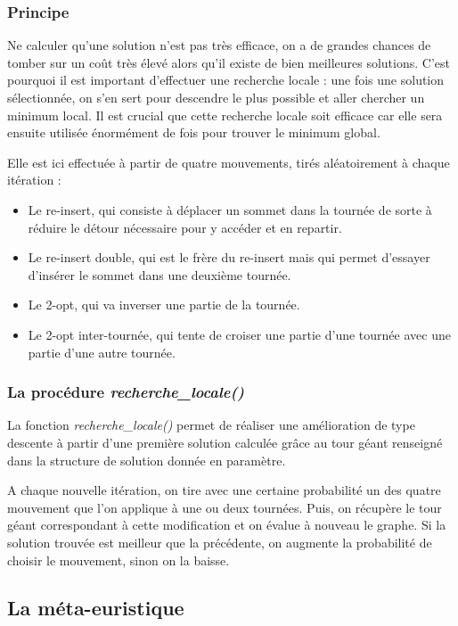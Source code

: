 \documentclass[12pt]{article}
\begin{document}
	\subsubsection{Principe}
	Ne calculer qu'une solution n'est pas très efficace, on a de grandes chances de tomber sur un coût très élevé alors qu'il existe de bien meilleures solutions. C'est pourquoi il est important d'effectuer une recherche locale : une fois une solution sélectionnée, on s'en sert pour descendre le plus possible et aller chercher un minimum local. Il est crucial que cette recherche locale soit efficace car elle sera ensuite utilisée énormément de fois pour trouver le minimum global.\\\par
	Elle est ici effectuée à partir de quatre mouvements, tirés aléatoirement à chaque itération :\\
 \begin{itemize}
     \item Le re-insert, qui consiste à déplacer un sommet dans la tournée de sorte à réduire le détour nécessaire pour y accéder et en repartir.
     \item Le re-insert double, qui est le frère du re-insert mais qui permet d'essayer d'insérer le sommet dans une deuxième tournée.
     \item Le 2-opt, qui va inverser une partie de la tournée.
     \item Le 2-opt inter-tournée, qui tente de croiser une partie d'une tournée avec une partie d'une autre tournée.
 \end{itemize}
	\subsubsection{La procédure \emph{recherche\_locale()}}\hypertarget{recherche}{}
	 La fonction \emph{recherche\_locale()} permet de réaliser une amélioration de type descente à partir d’une première solution calculée grâce au tour géant renseigné dans la structure de solution donnée en paramètre.\par
	 A chaque nouvelle itération, on tire avec une certaine probabilité un des quatre mouvement que l'on applique à une ou deux tournées. Puis, on récupère le tour géant correspondant à cette modification et on évalue à nouveau le graphe. Si la solution trouvée est meilleur que la précédente, on augmente la probabilité de choisir le mouvement, sinon on la baisse.
	
	\subsection{La méta-euristique}\hypertarget{grasp}{}
\end{document}
